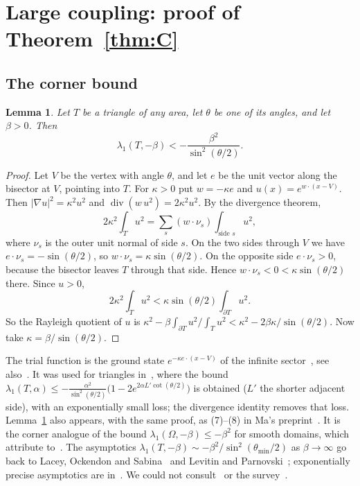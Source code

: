 \documentclass[11pt]{article}
\newtheorem{lemma}[theorem]{Lemma}
\theoremstyle{remark}
\begin{document}
\section{Large coupling: proof of Theorem~\ref{thm:C}}\label{sec:C}

\subsection{The corner bound}

\begin{lemma}\label{lem:corner}
Let $T$ be a triangle of any area, let $\theta$ be one of its angles, and let $\beta>0$. Then
\[
  \lambda_1(T,-\beta)<-\frac{\beta^2}{\sin^2(\theta/2)} .
\]
\end{lemma}

\begin{proof}
Let $V$ be the vertex with angle $\theta$, and let $e$ be the unit vector along the bisector at $V$,
pointing into $T$. For $\kappa>0$ put $w=-\kappa e$ and $u(x)=e^{w\cdot(x-V)}$. Then
$|\nabla u|^2=\kappa^2u^2$ and $\operatorname{div}(w\,u^2)=2\kappa^2u^2$. By the divergence theorem,
\[
  2\kappa^2\int_Tu^2=\sum_{s}(w\cdot\nu_s)\int_{\text{side }s}u^2 ,
\]
where $\nu_s$ is the outer unit normal of side $s$. On the two sides through $V$ we have
$e\cdot\nu_s=-\sin(\theta/2)$, so $w\cdot\nu_s=\kappa\sin(\theta/2)$. On the opposite side
$e\cdot\nu_s>0$, because the bisector leaves $T$ through that side. Hence $w\cdot\nu_s<0<\kappa\sin(\theta/2)$
there. Since $u>0$,
\[
  2\kappa^2\int_Tu^2<\kappa\sin(\theta/2)\int_{\partial T}u^2 .
\]
So the Rayleigh quotient of $u$ is
$\kappa^2-\beta\int_{\partial T}u^2/\int_Tu^2<\kappa^2-2\beta\kappa/\sin(\theta/2)$. Now take
$\kappa=\beta/\sin(\theta/2)$.
\end{proof}

The trial function is the ground state $e^{-\kappa e\cdot(x-V)}$ of the infinite
sector~\cite[Example~2.5, Lemma~2.6]{LP}, see also~\cite{KP}. It was used for triangles
in~\cite[Theorem~5.3]{KLV}, where the bound $\lambda_1(T,\alpha)\le-\frac{\alpha^2}{\sin^2(\theta/2)}
\bigl(1-2e^{2\alpha L'\cot(\theta/2)}\bigr)$ is obtained ($L'$ the shorter adjacent side), with an
exponentially small loss; the divergence identity removes that loss. Lemma~\ref{lem:corner} also appears,
with the same proof, as (7)--(8) in Ma's preprint~\cite{Ma}. It is the corner analogue of the bound
$\lambda_1(\Omega,-\beta)\le-\beta^2$ for smooth domains, which~\cite{BP} attribute
to~\cite[Theorem~2.1]{GS}. The asymptotics $\lambda_1(T,-\beta)\sim-\beta^2/\sin^2(\theta_{\min}/2)$ as
$\beta\to\infty$ go back to Lacey, Ockendon and Sabina~\cite{LOS} and Levitin and Parnovski~\cite{LP};
exponentially precise asymptotics are in~\cite{Khalile,HP}. We could not consult~\cite{LOS} or the
survey~\cite{BFK}.
\end{document}
